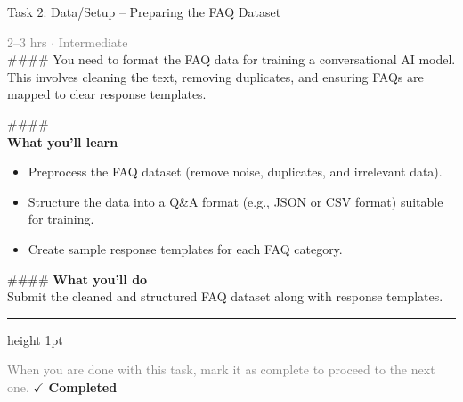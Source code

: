 \documentclass[10pt,a4paper]{article}
\begin{document}
\begin{taskbox}{Task 2: Data/Setup – Preparing the FAQ Dataset}

    {\small \textcolor{gray}{2--3 hrs $\cdot$ Intermediate}}\\[12pt]

    \#\#\#\# 
You need to format the FAQ data for training a conversational AI model. This involves cleaning the text, removing duplicates, and ensuring FAQs are mapped to clear response templates.

\#\#\#\# \\[10pt]
\vspace{8pt}
{\large \textbf{\textcolor{brandLight}{What you'll learn}}}\\[4pt]
\begin{itemize}
    \item Preprocess the FAQ dataset (remove noise, duplicates, and irrelevant data).
    \item Structure the data into a Q\&A format (e.g., JSON or CSV format) suitable for training.
    \item Create sample response templates for each FAQ category.
\end{itemize}

\#\#\#\# \vspace{8pt}
{\large \textbf{\textcolor{brandLight}{What you'll do}}}\\[4pt]
Submit the cleaned and structured FAQ dataset along with response templates.\par

    \vspace{16pt}

    \textcolor{cardBorder}{\hrule height 1pt}\vspace{8pt}

    \small \textcolor{gray}{When you are done with this task, mark it as complete to proceed to the next one.} \hfill \textbf{\textcolor{brandDark}{$\checkmark$ Completed}}

\end{taskbox}
\end{document}
